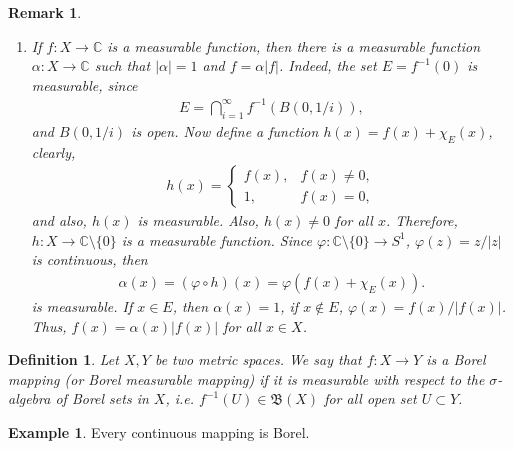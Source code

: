 \documentclass[11pt]{book}
\newtheorem{definition}{Definition}[chapter]
\newtheorem{remark}{Remark}[chapter]
\theoremstyle{definition}
\newtheorem{example}{Example}[chapter]
\numberwithin{equation}{chapter}
\def\BB{\mathfrak{B}}
\begin{document}
\begin{remark}
\begin{enumerate}[label=(\alph*)]
    \item If $f:X \to \mathbb{C}$ is a measurable function, then there is a measurable function $\alpha: X \to \mathbb{C}$ such that $\left|\alpha\right| = 1$ and $f = \alpha \left|f\right|$. Indeed, the set $E = f^{-1}(0)$ is measurable, since
    \begin{align*}
        E = \bigcap^\infty_{i=1} f^{-1}\left(B\left(0,1/i\right)\right),
    \end{align*}
    and $B\left(0,1/i\right)$ is open. Now define a function $h(x) = f(x) + \chi_E(x)$, clearly,
    \begin{align*}
        h(x) = \begin{cases}
            f(x), & f(x) \neq 0, \\
            1, & f(x) = 0,
        \end{cases}
    \end{align*}
    and also, $h(x)$ is measurable. Also, $h(x) \neq 0$ for all $x$. Therefore, $h:X \to \mathbb{C} \setminus \{0\}$ is a measurable function. Since $\varphi:\mathbb{C} \setminus \{0\} \to S^1$, $\varphi(z) = z/|z|$ is continuous, then 
    \begin{align*}
        \alpha(x) = (\varphi\circ h)(x) = \varphi(f(x) + \chi_E(x)).
    \end{align*}
    is measurable. If $x \in E$, then $\alpha(x) = 1$, if $x \notin E$, $\varphi(x) = f(x)/|f(x)|$. Thus, $f(x) = \alpha(x) |f(x)|$ for all $x \in X$.
\end{enumerate}
\end{remark}



\medskip

\begin{definition}\label{def_borel_map}
Let $X,Y$ be two metric spaces. We say that $f:X\to Y$ is a Borel mapping (or Borel measurable mapping) if it is measurable with respect to the $\sigma$-algebra of Borel sets in $X$, i.e. $f^{-1}(U) \in \BB(X)$ for all open set $U \subset Y$.
\end{definition}

\medskip

\begin{example}
Every continuous mapping is Borel.
\end{example}

\medskip
\end{document}
